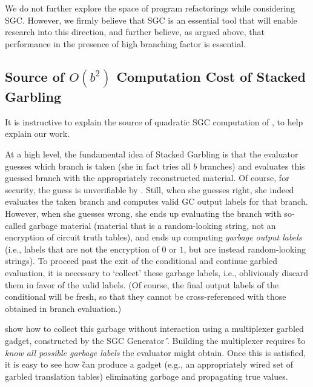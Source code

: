 We do not further explore the space of program refactorings while
considering SGC.
However, we firmly believe that SGC is an essential tool that will
enable research into this direction, and further believe, as argued
above, that performance in the presence of high branching factor is
essential.





 




\subsection{Source of $O(b^2)$ Computation Cost of \HK Stacked Garbling }
\label{sec:bsquaredcost}

It is instructive to explain the source of quadratic SGC computation of \HK, to help explain our work.

At a high level, the fundamental idea of Stacked Garbling is that the evaluator \E
guesses which branch is taken (she in fact tries  all $b$
branches) and evaluates this guessed branch with the appropriately reconstructed material.  Of course, for security, the guess is unverifiable by \E. 
Still, when she guesses right, she indeed evaluates the taken branch and
computes valid GC output labels for that branch.
However, when she guesses wrong, she ends up evaluating the branch
with so-called garbage material (material that is a random-looking string, not
an encryption of circuit truth tables), and ends up computing
\emph{garbage output labels} (i.e., labels that are not the encryption
of $0$ or $1$, but are instead random-looking strings).
%
To proceed past the exit of the conditional and continue garbled evaluation, it is necessary to
`collect'  these garbage labels, i.e., obliviously  discard them in favor of the valid
labels.  (Of course, the final output labels of the conditional will be fresh,  so that they cannot be cross-referenced with those obtained in branch evaluation.)


\HK show how to collect this garbage without
interaction using a 
multiplexer garbled gadget, constructed by the SGC Generator \G.  
Building the \HK multiplexer requires \G to {\em know all possible
garbage labels} the evaluator might obtain.  Once this is satisfied, it is easy to see how \G can produce a gadget (e.g., an appropriately wired set of garbled translation tables) eliminating garbage and propagating true values.


